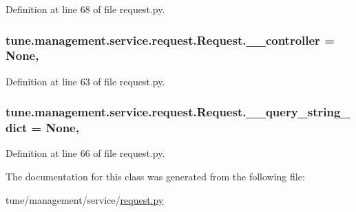 Definition at line 68 of file request.\-py.

\hypertarget{classtune_1_1management_1_1service_1_1request_1_1Request_a16ea1de1e3528c170d6d6d4e886d8a57}{
\subsubsection[{\-\_\-\-\_\-controller}]{\setlength{\rightskip}{0pt plus 5cm}tune.\-management.\-service.\-request.\-Request.\-\_\-\-\_\-controller = None\hspace{0.3cm}{\ttfamily [static]}, {\ttfamily [private]}}}\label{classtune_1_1management_1_1service_1_1request_1_1Request_a16ea1de1e3528c170d6d6d4e886d8a57}


Definition at line 63 of file request.\-py.

\hypertarget{classtune_1_1management_1_1service_1_1request_1_1Request_aa260968d316e04dd072fb75d678cd09f}{
\subsubsection[{\-\_\-\-\_\-query\-\_\-string\-\_\-dict}]{\setlength{\rightskip}{0pt plus 5cm}tune.\-management.\-service.\-request.\-Request.\-\_\-\-\_\-query\-\_\-string\-\_\-dict = None\hspace{0.3cm}{\ttfamily [static]}, {\ttfamily [private]}}}\label{classtune_1_1management_1_1service_1_1request_1_1Request_aa260968d316e04dd072fb75d678cd09f}


Definition at line 66 of file request.\-py.



The documentation for this class was generated from the following file\-:\begin{DoxyCompactItemize}
\item 
tune/management/service/\hyperlink{request_8py}{request.\-py}\end{DoxyCompactItemize}
